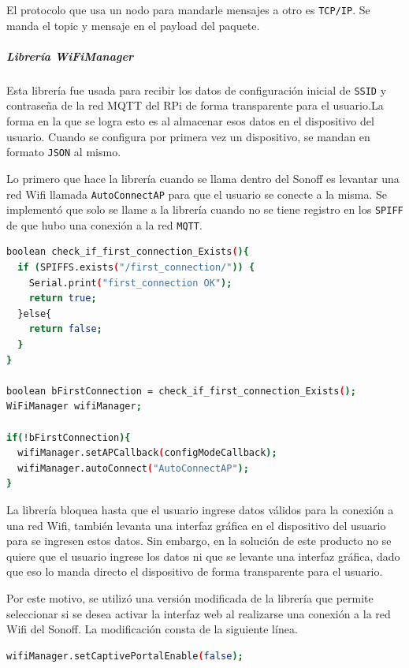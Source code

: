 El protocolo que usa un nodo para mandarle mensajes a otro es \lstinline[columns=fixed]{TCP/IP}. Se manda el topic y mensaje en el payload del paquete.~

\subparagraph{Librería WiFiManager}
%
Esta librería fue usada para recibir los datos de configuración inicial de \lstinline[columns=fixed]{SSID} y contraseña de la red MQTT del RPi de forma transparente para el usuario.La forma en la que se logra esto es al almacenar esos datos en el dispositivo del usuario. Cuando se configura por primera vez un dispositivo, se mandan en formato \lstinline[columns=fixed]{JSON} al mismo. 

Lo primero que hace la librería cuando se llama dentro del Sonoff es levantar una red Wifi llamada \lstinline[columns=fixed]{AutoConnectAP} para que el usuario se conecte a la misma. Se implementó que solo se llame a la librería cuando no se tiene registro en los \lstinline[columns=fixed]{SPIFF} de que hubo una conexión a la red \lstinline[columns=fixed]{MQTT}.

\begin{lstlisting}[language=bash]
boolean check_if_first_connection_Exists(){
  if (SPIFFS.exists("/first_connection/")) {
    Serial.print("first_connection OK");
    return true;
  }else{
    return false;
  }
}

boolean bFirstConnection = check_if_first_connection_Exists();
WiFiManager wifiManager;

if(!bFirstConnection){
  wifiManager.setAPCallback(configModeCallback);
  wifiManager.autoConnect("AutoConnectAP");
}
\end{lstlisting}

La librería bloquea hasta que el usuario ingrese datos válidos para la conexión a una red Wifi, también levanta una interfaz gráfica en el dispositivo del usuario para se ingresen estos datos. Sin embargo, en la solución de este producto no se quiere que el usuario ingrese los datos ni que se levante una interfaz gráfica, dado que eso lo manda directo el dispositivo de forma transparente para el usuario.

Por este motivo, se utilizó una versión modificada de la librería que permite seleccionar si se desea activar la interfaz web al realizarse una conexión a la red Wifi del Sonoff. La modificación consta de la siguiente línea.

\begin{lstlisting}[language=bash]
wifiManager.setCaptivePortalEnable(false);
\end{lstlisting}

